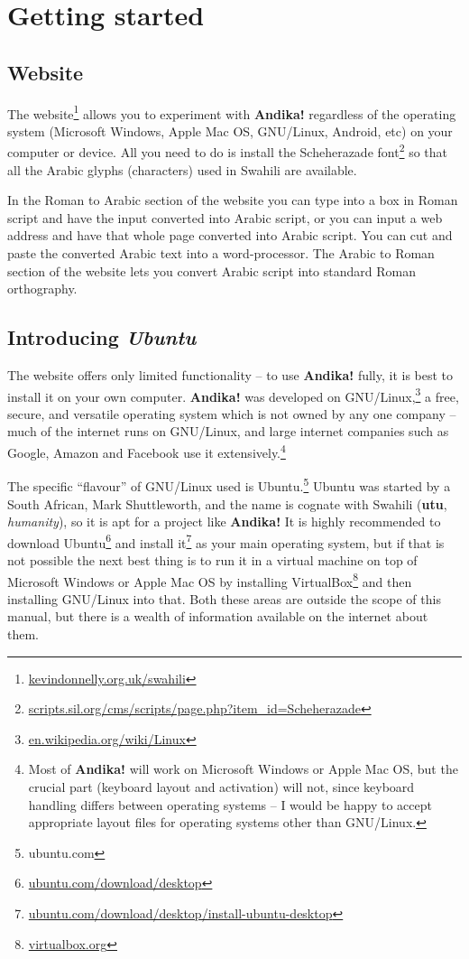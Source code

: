 \chapter{Getting started}
\label{ch:started}

\section{Website}

The website\footnote{\url{kevindonnelly.org.uk/swahili}} allows you to experiment with \textbf{Andika!} regardless of the operating system (Microsoft Windows, Apple Mac OS, GNU/Linux, Android, etc) on your computer or device.  All you need to do is install the Scheherazade font\footnote{\url{scripts.sil.org/cms/scripts/page.php?item_id=Scheherazade}} so that all the Arabic glyphs (characters) used in Swahili are available.

In the Roman to Arabic section of the website you can type into a box in Roman script and have the input converted into Arabic script, or you can input a web address and have that whole page converted into Arabic script.  You can cut and paste the converted Arabic text into a word-processor.  The Arabic to Roman section of the website lets you convert Arabic script into standard Roman orthography.

\section{Introducing \textit{Ubuntu}}

The website offers only limited functionality -- to use \textbf{Andika!} fully, it is best to install it on your own computer.  \textbf{Andika!} was developed on GNU/Linux,\footnote{\url{en.wikipedia.org/wiki/Linux}} a free, secure, and versatile operating system which is not owned by any one company -- much of the internet runs on GNU/Linux, and large internet companies such as Google, Amazon and Facebook use it extensively.\footnote{Most of \textbf{Andika!} will work on Microsoft Windows or Apple Mac OS, but the crucial part (keyboard layout and activation) will not, since keyboard handling differs between operating systems -- I would be happy to accept appropriate layout files for operating systems other than GNU/Linux.}

The specific ``flavour'' of GNU/Linux used is Ubuntu.\footnote{ubuntu.com}  Ubuntu was started by a South African, Mark Shuttleworth, and the name is cognate with Swahili  (\textbf{utu}, \textit{humanity}), so it is apt for a project like \textbf{Andika!}  It is highly recommended to download Ubuntu\footnote{\url{ubuntu.com/download/desktop}} and install it\footnote{\url{ubuntu.com/download/desktop/install-ubuntu-desktop}} as your main operating system, but if that is not possible the next best thing is to run it in a virtual machine on top of Microsoft Windows or Apple Mac OS by installing VirtualBox\footnote{\url{virtualbox.org}} and then installing GNU/Linux into that.  Both these areas are outside the scope of this manual, but there is a wealth of information available on the internet about them.


